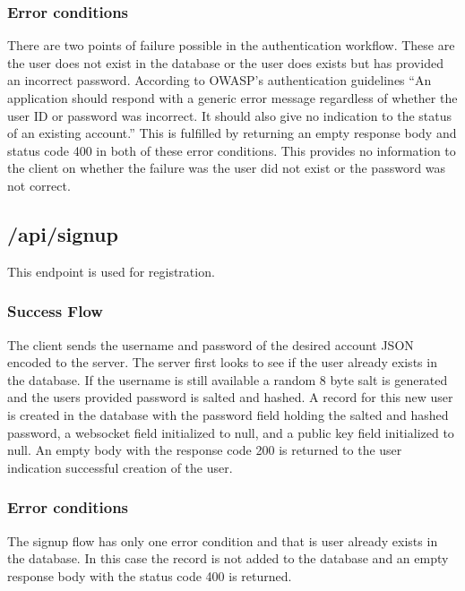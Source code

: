 \subsubsection{Error conditions}


There are two points of failure possible in the authentication workflow. These are the user does not exist in the database or the user does exists but has provided an incorrect password. According to OWASP’s authentication guidelines “An application should respond with a generic error message regardless of whether the user ID or password was incorrect. It should also give no indication to the status of an existing account.” \cite{owasp-auth} This is fulfilled by returning an empty response body and status code 400 in both of these error conditions. This provides no information to the client on whether the failure was the user did not exist or the password was not correct. 


\subsection{/api/signup}


This endpoint is used for registration.


\subsubsection{Success Flow}


The client sends the username and password of the desired account JSON encoded to the server. The server first looks to see if the user already exists in the database. If the username is still available a random 8 byte salt is generated and the users provided password is salted and hashed. A record for this new user is created in the database with the password field holding the salted and hashed password, a websocket field initialized to null, and a public key field initialized to null. An empty body with the response code 200 is returned to the user indication successful creation of the user.


\subsubsection{Error conditions}


The signup flow has only one error condition and that is user already exists in the database. In this case the record is not added to the database and an empty response body with the status code 400 is returned.



